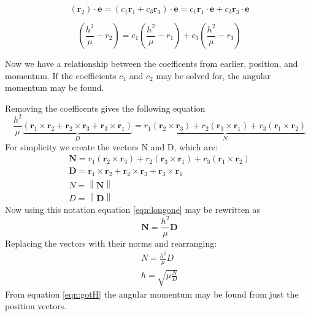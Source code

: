 \documentclass[12pt]{article}
\newcommand{\norm}[1]{\left\lVert#1\right\rVert}
\begin{document}
	 \begin{equation}
	 \left(\mathbf{r}_2 \right)\cdot\mathbf{ e }= \left(c_1 \mathbf{ r }_1 + c_3 \mathbf{r}_3\right)\cdot\mathbf{ e }=c_1 \mathbf{ r }_1\cdot\mathbf{ e } + c_3 \mathbf{r}_3\cdot\mathbf{ e }
	 \label{eqn:edot}
	 \end{equation}
	 
	 
	 \begin{equation}
	 \left(\frac { h ^ { 2 } } { \mu } - r_2\right) =c_1 \left(\frac { h ^ { 2 } } { \mu } - r_1\right)  + c_3\left(\frac { h ^ { 2 } } { \mu } - r _3\right)
	 \label{eqn:edot2}
	 \end{equation}
	 
	 Now we have a relationship between the coefficents from earlier, position, and momentum. If the coefficients $c_1$ and $c_2$ may be solved for, the angular momentum may be found. 
	 
	 Removing the coefficents gives the following equation
	 \begin{equation}
	 \frac { h ^ { 2 } } { \mu } \underbrace{\left( \mathbf { r } _ { 1 } \times \mathbf { r } _ { 2 } + \mathbf { r } _ { 2 } \times \mathbf { r } _ { 3 } + \mathbf { r } _ { 3 } \times \mathbf { r } _ { 1 } \right)}_{D} = \underbrace{r _ { 1 } \left( \mathbf { r } _ { 2 } \times \mathbf { r } _ { 3 } \right) + r _ { 2 } \left( \mathbf { r } _ { 3 } \times \mathbf { r } _ { 1 } \right) + r _ { 3 } \left( \mathbf { r } _ { 1 } \times \mathbf { r } _ { 2 } \right)}_{N}
	 \label{eqn:longone}
	 \end{equation}
	 For simplicity we create the vectors N and D, which are: 
	 \begin{eqnarray}
	 	 \mathbf { N } = r _ { 1 } \left( \mathbf { r } _ { 2 } \times \mathbf { r } _ { 3 } \right) + r _ { 2 } \left( \mathbf { r } _ { 3 } \times \mathbf { r } _ { 1 } \right) + r _ { 3 } \left( \mathbf { r } _ { 1 } \times \mathbf { r } _ { 2 } \right)\\
	 	 \mathbf { D } = \mathbf { r } _ { 1 } \times \mathbf { r } _ { 2 } + \mathbf { r } _ { 2 } \times \mathbf { r } _ { 3 } + \mathbf { r } _ { 3 } \times \mathbf { r } _ { 1 }\\
	 	 N=\norm{\mathbf{N}}\\
	 	 D=\norm{\mathbf{D}}
	 \end{eqnarray}
 	Now using this notation equation \ref{eqn:longone} may be rewritten as 
	\begin{equation}
	\mathbf { N } = \frac { h ^ { 2 } } { \mu } \mathbf { D }
	\end{equation}
	Replacing the vectors with their norms and rearranging:
	\begin{eqnarray}
	N = \frac { h ^ { 2 } } { \mu } D\\
	h = \sqrt { \mu \frac { N } { D } }
	\label{eqn:gotH}
	\end{eqnarray}
	From equation \ref{eqn:gotH} the angular momentum may be found from just the position vectors.
	
\end{document}
